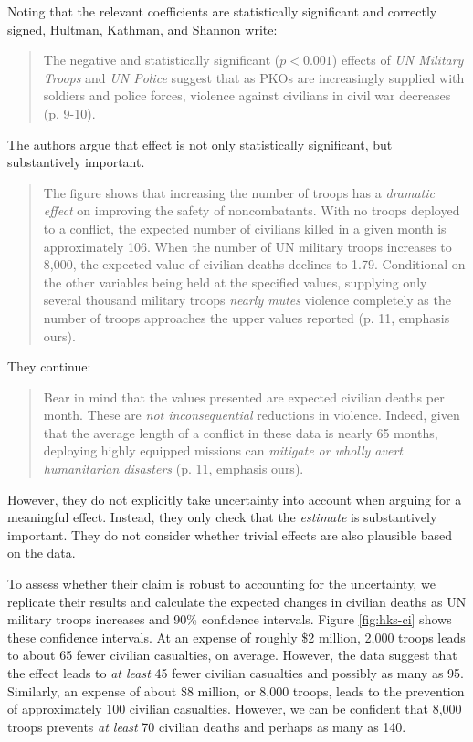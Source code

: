 \documentclass[12pt]{article}
\begin{document}
Noting that the relevant coefficients are statistically significant and correctly signed, Hultman, Kathman, and Shannon write:

\begin{quote}
The negative and statistically significant ($p < 0.001$) effects of \textit{UN Military Troops} and \textit{UN Police} suggest that as PKOs are increasingly supplied with soldiers and police forces, violence against civilians in civil war decreases (p. 9-10).
\end{quote}

The authors argue that effect is not only statistically significant, but substantively important.

\begin{quote}
The figure shows that increasing the number of troops has a \emph{dramatic effect} on improving the safety of noncombatants. With no troops deployed to a conflict, the expected number of civilians killed in a given month is approximately 106. When the number of UN military troops increases to 8,000, the expected value of civilian deaths declines to 1.79. Conditional on the other variables being held at the specified values, supplying only several thousand military troops \emph{nearly mutes} violence completely as the number of troops approaches the upper values reported (p. 11, emphasis ours).
\end{quote}

\noindent They continue:

\begin{quote}
Bear in mind that the values presented are expected civilian deaths per month. These are \emph{not inconsequential} reductions in violence. Indeed, given that the average length of a conflict in these data is nearly 65 months, deploying highly equipped missions can \emph{mitigate or wholly avert humanitarian disasters} (p. 11, emphasis ours).
\end{quote}

However, they do not explicitly take uncertainty into account when arguing for a meaningful effect. Instead, they only check that the \emph{estimate} is substantively important. They do not consider whether trivial effects are also plausible based on the data.

To assess whether their claim is robust to accounting for the uncertainty, we replicate their results and calculate the expected changes in civilian deaths as UN military troops increases and 90\% confidence intervals. Figure \ref{fig:hks-ci} shows these confidence intervals. At an expense of roughly \$2 million, 2,000 troops leads to about 65 fewer civilian casualties, on average. However, the data suggest that the effect leads to \textit{at least} 45 fewer civilian casualties and possibly as many as 95. Similarly, an expense of about \$8 million, or 8,000 troops, leads to the prevention of approximately 100 civilian casualties. However, we can be confident that 8,000 troops prevents \emph{at least} 70 civilian deaths and perhaps as many as 140. 
\end{document}
